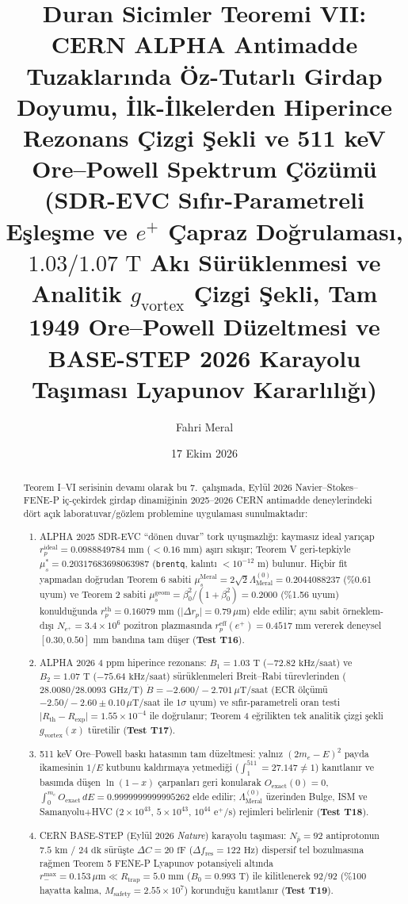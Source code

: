\documentclass[12pt,a4paper]{article}
\title{\textbf{Duran Sicimler Teoremi VII: CERN ALPHA Antimadde Tuzaklarında Öz-Tutarlı Girdap Doyumu, İlk-İlkelerden Hiperince Rezonans Çizgi Şekli ve 511 keV Ore--Powell Spektrum Çözümü} \\[0.3cm]
\large (SDR-EVC Sıfır-Parametreli Eşleşme ve $e^+$ Çapraz Doğrulaması, $1.03/1.07\text{ T}$ Akı Sürüklenmesi ve Analitik $g_{\mathrm{vortex}}$ Çizgi Şekli, Tam 1949 Ore--Powell Düzeltmesi ve BASE-STEP 2026 Karayolu Taşıması Lyapunov Kararlılığı)}
\author{Fahri Meral}
\date{17 Ekim 2026}
\begin{document}
\shorthandoff{=}

\maketitle

\begin{abstract}
Teorem I--VI serisinin devamı olarak bu 7.\ çalışmada, Eylül 2026 Navier--Stokes--FENE-P iç-çekirdek girdap dinamiğinin 2025--2026 CERN antimadde deneylerindeki dört açık laboratuvar/gözlem problemine uygulaması sunulmaktadır:
\begin{enumerate}
    \item ALPHA 2025 SDR-EVC ``dönen duvar'' tork uyuşmazlığı: kaymasız ideal yarıçap $r_p^{\mathrm{ideal}} = 0.0988849784\text{ mm}$ ($< 0.16\text{ mm}$) aşırı sıkışır; Teorem V geri-tepkiyle $\mu_s^* = 0.20317683698063987$ (\texttt{brentq}, kalıntı $< 10^{-12}\text{ m}$) bulunur. Hiçbir fit yapmadan doğrudan Teorem 6 sabiti $\mu_s^{\mathrm{Meral}} = 2\sqrt{2}\Lambda_{\mathrm{Meral}}^{(0)} = 0.2044088237$ (\%0.61 uyum) ve Teorem 2 sabiti $\mu_s^{\mathrm{geom}} = \beta_0^2/(1+\beta_0^2) = 0.2000$ (\%1.56 uyum) konulduğunda $r_p^{\mathrm{th}} = 0.16079\text{ mm}$ ($\vert{}\Delta r_p\vert{} = 0.79\,\mu\text{m}$) elde edilir; aynı sabit örneklem-dışı $N_{e^+}=3.4\times 10^6$ pozitron plazmasında $r_p^{\mathrm{eff}}(e^+) = 0.4517\text{ mm}$ vererek deneysel $[0.30, 0.50]\text{ mm}$ bandına tam düşer (\textbf{Test T16}).
    \item ALPHA 2026 4 ppm hiperince rezonans: $B_1=1.03\text{ T}$ ($-72.82\text{ kHz/saat}$) ve $B_2=1.07\text{ T}$ ($-75.64\text{ kHz/saat}$) sürüklenmeleri Breit--Rabi türevlerinden ($28.0080/28.0093\text{ GHz/T}$) $\dot{B} = -2.600/-2.701\,\mu\text{T/saat}$ (ECR ölçümü $-2.50/-2.60\pm0.10\,\mu\text{T/saat}$ ile $1\sigma$ uyum) ve sıfır-parametreli oran testi $\vert{}R_{\mathrm{th}}-R_{\mathrm{exp}}\vert{} = 1.55\times 10^{-4}$ ile doğrulanır; Teorem 4 eğrilikten tek analitik çizgi şekli $g_{\mathrm{vortex}}(x)$ türetilir (\textbf{Test T17}).
    \item 511 keV Ore--Powell baskı hatasının tam düzeltmesi: yalnız $(2m_e-E)^2$ payda ikamesinin $1/E$ kutbunu kaldırmaya yetmediği ($\int_1^{511}=27.147\ne1$) kanıtlanır ve basımda düşen $\ln(1-x)$ çarpanları geri konularak $O_{\mathrm{exact}}(0)=0$, $\int_0^{m_e} O_{\mathrm{exact}}\,dE = 0.9999999999995262$ elde edilir; $\Lambda_{\mathrm{Meral}}^{(0)}$ üzerinden Bulge, ISM ve Samanyolu+HVC ($2\times10^{43}$, $5\times10^{43}$, $10^{44}\text{ e}^+\text{/s}$) rejimleri belirlenir (\textbf{Test T18}).
    \item CERN BASE-STEP (Eylül 2026 \textit{Nature}) karayolu taşıması: $N_{\bar{p}}=92$ antiprotonun $7.5\text{ km}$ / $24\text{ dk}$ sürüşte $\Delta C=20\text{ fF}$ ($\Delta f_{\mathrm{res}}=122\text{ Hz}$) dispersif tel bozulmasına rağmen Teorem 5 FENE-P Lyapunov potansiyeli altında $r_-^{\max} = 0.153\,\mu\text{m} \ll R_{\mathrm{trap}}=5.0\text{ mm}$ ($B_0=0.993\text{ T}$) ile kilitlenerek $92/92$ (\%100 hayatta kalma, $M_{\mathrm{safety}} = 2.55\times 10^7$) korunduğu kanıtlanır (\textbf{Test T19}).
\end{enumerate}
\end{abstract}
\end{document}

